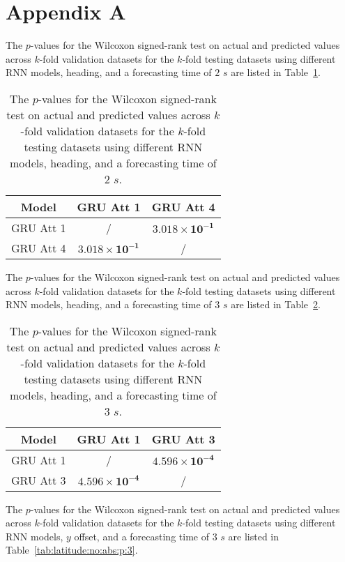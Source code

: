 \appendix
\section{Appendix A}
\label{appA}

The $p$-values for the Wilcoxon signed-rank test on actual and predicted values across $k$-fold validation datasets for the $k$-fold testing datasets using different RNN models, heading, and a forecasting time of $2$ $s$ are listed in Table~\ref{tab:direction:p:2}.

\begin{table}[!ht]
	\centering
	\begin{tabular}{|c|c|c|}
		\hline
		Model & GRU Att 1 & GRU Att 4 \\ \hline
		GRU Att 1 & / & $\mathbf{3.018 \times 10^{-1}}$ \\ \hline
		GRU Att 4 & $\mathbf{3.018 \times 10^{-1}}$ & / \\ \hline
	\end{tabular}
	\caption{The $p$-values for the Wilcoxon signed-rank test on actual and predicted values across $k$-fold validation datasets for the $k$-fold testing datasets using different RNN models, heading, and a forecasting time of $2$ $s$.}
	\label{tab:direction:p:2}
\end{table}

The $p$-values for the Wilcoxon signed-rank test on actual and predicted values across $k$-fold validation datasets for the $k$-fold testing datasets using different RNN models, heading, and a forecasting time of $3$ $s$ are listed in Table~\ref{tab:direction:p:3}.

\begin{table}[!ht]
	\centering
	\begin{tabular}{|c|c|c|}
		\hline
		Model & GRU Att 1 & GRU Att 3 \\ \hline
		GRU Att 1 & / & $\mathbf{4.596 \times 10^{-4}}$ \\ \hline
		GRU Att 3 & $\mathbf{4.596 \times 10^{-4}}$ & / \\ \hline
	\end{tabular}
	\caption{The $p$-values for the Wilcoxon signed-rank test on actual and predicted values across $k$-fold validation datasets for the $k$-fold testing datasets using different RNN models, heading, and a forecasting time of $3$ $s$.}
	\label{tab:direction:p:3}
\end{table}

The $p$-values for the Wilcoxon signed-rank test on actual and predicted values across $k$-fold validation datasets for the $k$-fold testing datasets using different RNN models, $y$ offset, and a forecasting time of $3$ $s$ are listed in Table~\ref{tab:latitude:no:abs:p:3}.

